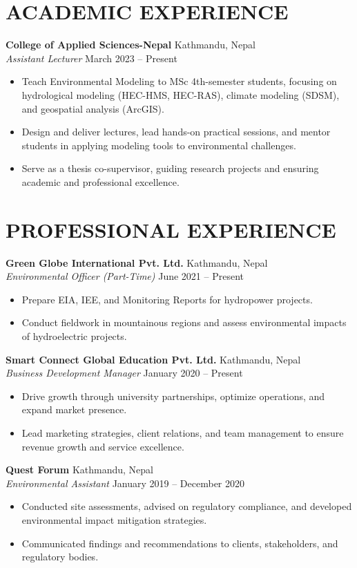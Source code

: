 \documentclass[a4paper,9pt]{extarticle}
\begin{document}
\section*{ACADEMIC EXPERIENCE}
\noindent
\textbf{College of Applied Sciences-Nepal} \hfill Kathmandu, Nepal\\ 
\textit{Assistant Lecturer} \hfill March 2023 -- Present 
\begin{itemize}
    \item Teach Environmental Modeling to MSc 4th-semester students, focusing on hydrological modeling (HEC-HMS, HEC-RAS), climate modeling (SDSM), and geospatial analysis (ArcGIS).
    \item Design and deliver lectures, lead hands-on practical sessions, and mentor students in applying modeling tools to environmental challenges.
    \item Serve as a thesis co-supervisor, guiding research projects and ensuring academic and professional excellence.
\end{itemize}

\section*{PROFESSIONAL EXPERIENCE}
\noindent
\textbf{Green Globe International Pvt. Ltd.} \hfill Kathmandu, Nepal\\ 
\textit{Environmental Officer (Part-Time)} \hfill June 2021 -- Present
\begin{itemize}
    \item Prepare EIA, IEE, and Monitoring Reports for hydropower projects.
    \item Conduct fieldwork in mountainous regions and assess environmental impacts of hydroelectric projects.
\end{itemize}

\noindent
\textbf{Smart Connect Global Education Pvt. Ltd.} \hfill Kathmandu, Nepal\\ 
\textit{Business Development Manager} \hfill January 2020 -- Present
\begin{itemize}
    \item Drive growth through university partnerships, optimize operations, and expand market presence.
    \item Lead marketing strategies, client relations, and team management to ensure revenue growth and service excellence.
\end{itemize}

\noindent
\textbf{Quest Forum} \hfill Kathmandu, Nepal\\ 
\textit{Environmental Assistant} \hfill January 2019 -- December 2020
\begin{itemize}
    \item Conducted site assessments, advised on regulatory compliance, and developed environmental impact mitigation strategies.
    \item Communicated findings and recommendations to clients, stakeholders, and regulatory bodies.
\end{itemize}
\end{document}
